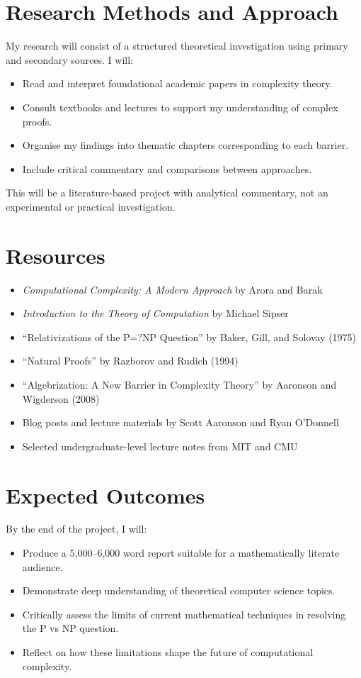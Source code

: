 \documentclass[12pt]{article}
\begin{document}
\section*{Research Methods and Approach}
My research will consist of a structured theoretical investigation using primary and secondary sources. I will:
\begin{itemize}
    \item Read and interpret foundational academic papers in complexity theory.
    \item Consult textbooks and lectures to support my understanding of complex proofs.
    \item Organise my findings into thematic chapters corresponding to each barrier.
    \item Include critical commentary and comparisons between approaches.
\end{itemize}
This will be a literature-based project with analytical commentary, not an experimental or practical investigation.

\section*{Resources}
\begin{itemize}
    \item \textit{Computational Complexity: A Modern Approach} by Arora and Barak
    \item \textit{Introduction to the Theory of Computation} by Michael Sipser
    \item “Relativizations of the P=?NP Question” by Baker, Gill, and Solovay (1975)
    \item “Natural Proofs” by Razborov and Rudich (1994)
    \item “Algebrization: A New Barrier in Complexity Theory” by Aaronson and Wigderson (2008)
    \item Blog posts and lecture materials by Scott Aaronson and Ryan O'Donnell
    \item Selected undergraduate-level lecture notes from MIT and CMU
\end{itemize}

\section*{Expected Outcomes}
By the end of the project, I will:
\begin{itemize}
    \item Produce a 5,000–6,000 word report suitable for a mathematically literate audience.
    \item Demonstrate deep understanding of theoretical computer science topics.
    \item Critically assess the limits of current mathematical techniques in resolving the P vs NP question.
    \item Reflect on how these limitations shape the future of computational complexity.
\end{itemize}
\end{document}

